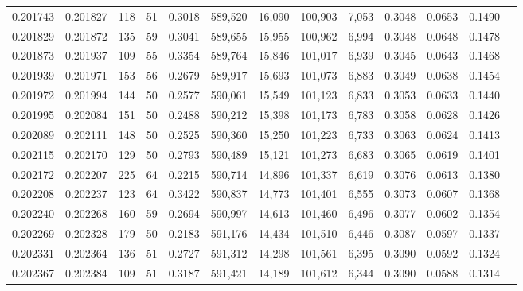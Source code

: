 \begin{tabular}{rrrrrrrrrrrrr}
0.201743 & 0.201827 &   118 &  51 &                                     0.3018 & 589,520 &  16,090 & 100,903 &   7,053 & 0.3048 & 0.0653 & 0.1490 \\
0.201829 & 0.201872 &   135 &  59 &                                     0.3041 & 589,655 &  15,955 & 100,962 &   6,994 & 0.3048 & 0.0648 & 0.1478 \\
0.201873 & 0.201937 &   109 &  55 &                                     0.3354 & 589,764 &  15,846 & 101,017 &   6,939 & 0.3045 & 0.0643 & 0.1468 \\
0.201939 & 0.201971 &   153 &  56 &                                     0.2679 & 589,917 &  15,693 & 101,073 &   6,883 & 0.3049 & 0.0638 & 0.1454 \\
0.201972 & 0.201994 &   144 &  50 &                                     0.2577 & 590,061 &  15,549 & 101,123 &   6,833 & 0.3053 & 0.0633 & 0.1440 \\
0.201995 & 0.202084 &   151 &  50 &                                     0.2488 & 590,212 &  15,398 & 101,173 &   6,783 & 0.3058 & 0.0628 & 0.1426 \\
0.202089 & 0.202111 &   148 &  50 &                                     0.2525 & 590,360 &  15,250 & 101,223 &   6,733 & 0.3063 & 0.0624 & 0.1413 \\
0.202115 & 0.202170 &   129 &  50 &                                     0.2793 & 590,489 &  15,121 & 101,273 &   6,683 & 0.3065 & 0.0619 & 0.1401 \\
0.202172 & 0.202207 &   225 &  64 &                                     0.2215 & 590,714 &  14,896 & 101,337 &   6,619 & 0.3076 & 0.0613 & 0.1380 \\
0.202208 & 0.202237 &   123 &  64 &                                     0.3422 & 590,837 &  14,773 & 101,401 &   6,555 & 0.3073 & 0.0607 & 0.1368 \\
0.202240 & 0.202268 &   160 &  59 &                                     0.2694 & 590,997 &  14,613 & 101,460 &   6,496 & 0.3077 & 0.0602 & 0.1354 \\
0.202269 & 0.202328 &   179 &  50 &                                     0.2183 & 591,176 &  14,434 & 101,510 &   6,446 & 0.3087 & 0.0597 & 0.1337 \\
0.202331 & 0.202364 &   136 &  51 &                                     0.2727 & 591,312 &  14,298 & 101,561 &   6,395 & 0.3090 & 0.0592 & 0.1324 \\
0.202367 & 0.202384 &   109 &  51 &                                     0.3187 & 591,421 &  14,189 & 101,612 &   6,344 & 0.3090 & 0.0588 & 0.1314 \\

\end{tabular}
